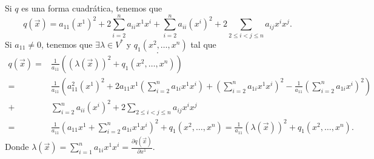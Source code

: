 Si $\displaystyle q $ es una forma cuadrática, tenemos que 
\[ q\left(\vec{x}\right) = a_{11}\left(x^{1}\right)^{2} + 2 \sum^{n}_{i = 2}a_{ii}x^{1}x^{i} + \sum^{n}_{i=2}a_{ii}\left(x^{i}\right)^{2} + 2 \sum^{}_{2 \leq i < j \leq n}a_{ij}x^{i}x^{j} .\]
Si $\displaystyle a_{11} \neq 0 $, tenemos que $\displaystyle \exists \lambda \in V^{*} $ y $\displaystyle q_{1}\left(x^{2}, \ldots, x^{n}\right) $ tal que 
\[ .\]
\[
\begin{split}
	q\left(\vec{x}\right) = & \frac{1}{a_{11}}\left(\left(\lambda\left(\vec{x}\right)\right)^{2}+q_{1}\left(x^{2}, \ldots, x^{n}\right)\right)\\
	= & \frac{1}{a_{11}}\left(a^{2}_{11}\left(x^{1}\right)^{2} + 2a_{11}x^{1}\left(\sum^{n}_{i=2}a_{1i}x^{1}x^{i}\right)+\left(\sum^{n}_{i=2}a_{1i}x^{1}x^{i}\right)^{2}-\frac{1}{a_{11}}\left(\sum^{n}_{i=2}a_{1i}x^{i}\right)^{2}\right) \\
	+ &  \sum^{n}_{i=2}a_{ii}\left(x^{i}\right)^{2}+2\sum^{}_{2\leq i < j \leq n}a_{ij}x^{i}x^{j}\\
	= & \frac{1}{a_{11}}\left(a_{11}x^{1}+\sum^{n}_{i=2}a_{1i}x^{1}x^{i}\right)^{2}+q_{1}\left(x^{2}, \ldots, x^{n}\right) 
	=  \frac{1}{a_{11}}\left(\lambda\left(\vec{x}\right)\right)^{2}+q_{1}\left(x^{2}, \ldots, x^{n}\right).
\end{split}
\]
Donde $\displaystyle \lambda \left(\vec{x}\right) = \sum^{n}_{i=1}a_{1i}x^{1}x^{i} = \frac{\partial q\left(\vec{x}\right)}{\partial x^{1}} $.

